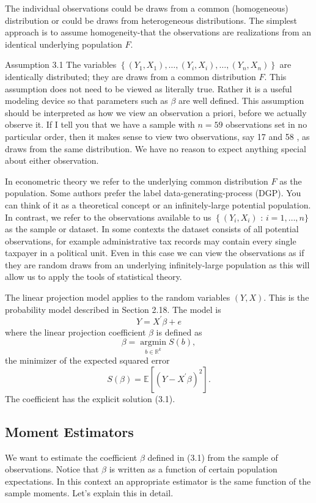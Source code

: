 \documentclass[10pt]{article}
\begin{document}
The individual observations could be draws from a common (homogeneous) distribution or could be draws from heterogeneous distributions. The simplest approach is to assume homogeneity-that the observations are realizations from an identical underlying population $F$.

Assumption 3.1 The variables $\left\{\left(Y_{1}, X_{1}\right), \ldots,\left(Y_{i}, X_{i}\right), \ldots,\left(Y_{n}, X_{n}\right)\right\}$ are identically distributed; they are draws from a common distribution $F$. This assumption does not need to be viewed as literally true. Rather it is a useful modeling device so that parameters such as $\beta$ are well defined. This assumption should be interpreted as how we view an observation a priori, before we actually observe it. If I tell you that we have a sample with $n=59$ observations set in no particular order, then it makes sense to view two observations, say 17 and 58 , as draws from the same distribution. We have no reason to expect anything special about either observation.

In econometric theory we refer to the underlying common distribution $F$ as the population. Some authors prefer the label data-generating-process (DGP). You can think of it as a theoretical concept or an infinitely-large potential population. In contrast, we refer to the observations available to us $\left\{\left(Y_{i}, X_{i}\right)\right.$ : $i=1, \ldots, n\}$ as the sample or dataset. In some contexts the dataset consists of all potential observations, for example administrative tax records may contain every single taxpayer in a political unit. Even in this case we can view the observations as if they are random draws from an underlying infinitely-large population as this will allow us to apply the tools of statistical theory.

The linear projection model applies to the random variables $(Y, X)$. This is the probability model described in Section 2.18. The model is
$$
Y=X^{\prime} \beta+e
$$
where the linear projection coefficient $\beta$ is defined as
$$
\beta=\underset{b \in \mathbb{R}^{k}}{\operatorname{argmin}} S(b),
$$
the minimizer of the expected squared error
$$
S(\beta)=\mathbb{E}\left[\left(Y-X^{\prime} \beta\right)^{2}\right] .
$$
The coefficient has the explicit solution (3.1).

\subsection{Moment Estimators}
We want to estimate the coefficient $\beta$ defined in (3.1) from the sample of observations. Notice that $\beta$ is written as a function of certain population expectations. In this context an appropriate estimator is the same function of the sample moments. Let's explain this in detail.
\end{document}
